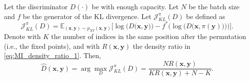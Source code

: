 \begin{theorem}
Let the discriminator $D(\cdot)$ be with enough capacity. Let $N$ be the batch size and $f$ be the generator of the KL divergence. Let $\mathcal{J}_{KL}^{\pi}(D)$ be defined as
\begin{equation}
\mathcal{J}_{KL}^{\pi}(D) =  \mathbb{E}_{(\mathbf{x},\mathbf{y}) \sim p_{XY}(\mathbf{x},\mathbf{y})}\biggl[\log\biggl(D\bigl(\mathbf{x},\mathbf{y}\bigr)\biggr)-f^*\biggl(\log\biggl(D\bigl(\mathbf{x},\pi(\mathbf{y})\bigr)\biggr)\biggr)\biggr].
\end{equation}
Denote with $K$ the number of indices in the same position after the permutation (i.e., the fixed points), and with $R(\mathbf{x},\mathbf{y})$ the density ratio in \eqref{eq:MI_density_ratio_1}.
Then,
\begin{equation}
\hat{D}(\mathbf{x},\mathbf{y}) =\arg \max_D \mathcal{J}_{KL}^{\pi}(D) = \frac{NR(\mathbf{x},\mathbf{y})}{KR(\mathbf{x},\mathbf{y})+N-K}.
\end{equation}
\end{theorem}

